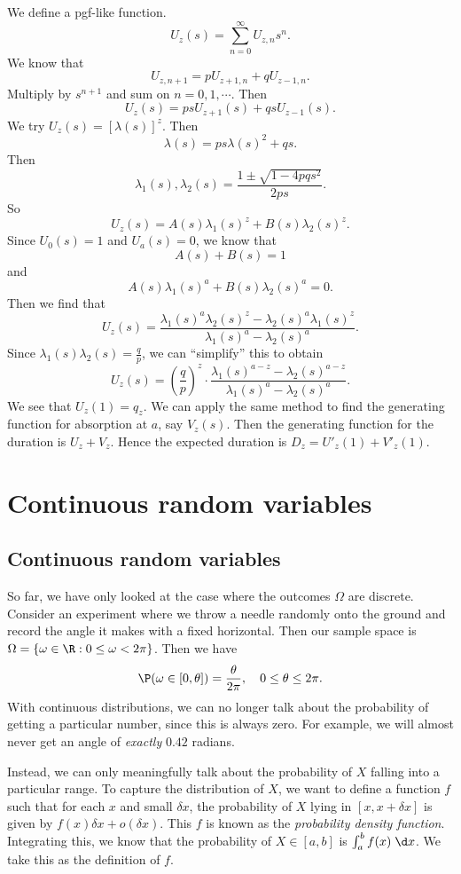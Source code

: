 \documentclass[a4paper]{article}
\begin{document}
We define a pgf-like function.
\[
  U_z(s) = \sum_{n = 0 }^\infty U_{z, n}s^n.
\]
We know that
\[
  U_{z, n + 1} = p U_{z + 1, n} + qU_{z - 1, n}.
\]
Multiply by $s^{n + 1}$ and sum on $n = 0, 1, \cdots$. Then
\[
  U_z(s) = psU_{z + 1}(s) + qsU_{z - 1}(s).
\]
We try $U_z(s) = [\lambda(s)]^z$. Then
\[
  \lambda(s) = ps\lambda(s)^2 + qs.
\]
Then
\[
  \lambda_1(s), \lambda_2(s) = \frac{1 \pm \sqrt{1 - 4pqs^2}}{2ps}.
\]
So
\[
  U_z(s) = A(s) \lambda_1(s)^z + B(s)\lambda_2(s)^z.
\]
Since $U_0(s) = 1$ and $U_a(s) = 0$, we know that
\[
  A(s) + B(s) = 1
\]
and
\[
  A(s)\lambda_1(s)^a + B(s)\lambda_2(s)^a = 0.
\]
Then we find that
\[
  U_z(s) = \frac{\lambda_1(s)^a\lambda_2(s)^z - \lambda_2(s)^a\lambda_1(s)^z}{\lambda_1(s)^a - \lambda_2(s)^a}.
\]
Since $\lambda_1(s)\lambda_2(s) = \frac{q}{p}$, we can ``simplify'' this to obtain
\[
  U_z(s) = \left(\frac{q}{p}\right)^z \cdot \frac{\lambda_1(s)^{a - z} - \lambda_2(s)^{a - z}}{\lambda_1(s)^a - \lambda_2(s)^a}.
\]
We see that $U_z(1) = q_z$. We can apply the same method to find the generating function for absorption at $a$, say $V_z(s)$. Then the generating function for the duration is $U_z + V_z$. Hence the expected duration is $D_z = U'_z(1) + V'_z(1).$
\section{Continuous random variables}
\subsection{Continuous random variables}
So far, we have only looked at the case where the outcomes $\Omega$ are discrete. Consider an experiment where we throw a needle randomly onto the ground and record the angle it makes with a fixed horizontal. Then our sample space is $\Omega = \{\omega\in \R: 0 \leq \omega < 2\pi\}$. Then we have
\[
  \P(\omega \in [0, \theta]) = \frac{\theta}{2\pi}, \quad 0 \leq \theta \leq 2\pi.
\]
With continuous distributions, we can no longer talk about the probability of getting a particular number, since this is always zero. For example, we will almost never get an angle of \emph{exactly} $0.42$ radians.

Instead, we can only meaningfully talk about the probability of $X$ falling into a particular range. To capture the distribution of $X$, we want to define a function $f$ such that for each $x$ and small $\delta x$, the probability of $X$ lying in $[x, x + \delta x]$ is given by $f(x) \delta x + o(\delta x)$. This $f$ is known as the \emph{probability density function}. Integrating this, we know that the probability of $X\in [a, b]$ is $\int_a^b f(x)\;\d x$. We take this as the definition of $f$.
\end{document}
